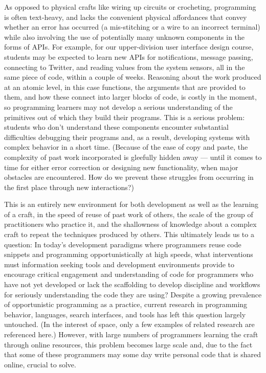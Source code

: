 \documentclass[12pt]{memoir}
\begin{document}
As opposed to physical crafts like wiring up circuits or crocheting, programming is often text-heavy, and lacks the convenient physical affordances that convey whether an error has occurred (a mis-stitching or a wire to an incorrect terminal) while also involving the use of potentially many unknown components in the forms of APIs.
For example, for our upper-division user interface design course, students may be expected to learn new APIs for notifications, message passing, connecting to Twitter, and reading values from the system sensors, all in the same piece of code, within a couple of weeks.
Reasoning about the work produced at an atomic level, in this case functions, the arguments that are provided to them, and how these connect into larger blocks of code, is costly in the moment, so programming learners may not develop a serious understanding of the primitives out of which they build their programs.
This is a serious problem: students who don't understand these components encounter substantial difficulties debugging their programs and, as a result, developing systems with complex behavior in a short time.
(Because of the ease of copy and paste, the complexity of past work incorporated is gleefully hidden away --- until it comes to time for either error correction or designing new functionality, when major obstacles are encountered.
How do we prevent these struggles from occurring in the first place through new interactions?)

This is an entirely new environment for both development as well as the learning of a craft, in the speed of reuse of past work of others, the scale of the group of practitioners who practice it, and the shallowness of knowledge about a complex craft to repeat the techniques produced by others.
This ultimately leads us to a question: In today's development paradigms where programmers reuse code snippets and programming opportunistically at high speeds, what interventions must information seeking tools and development environments provide to encourage critical engagement and understanding of code for programmers who have not yet developed or lack the scaffolding to develop discipline and workflows for seriously understanding the code they are using?  Despite a growing prevalence of opportunistic programming as a practice, current research in programming behavior, languages, search interfaces, and tools has left this question largely untouched.
(In the interest of space, only a few examples of related research are referenced here.) However, with large numbers of programmers learning the craft through online resources, this problem becomes large scale and, due to the fact that some of these programmers may some day write personal code that is shared online, crucial to solve.
\end{document}
